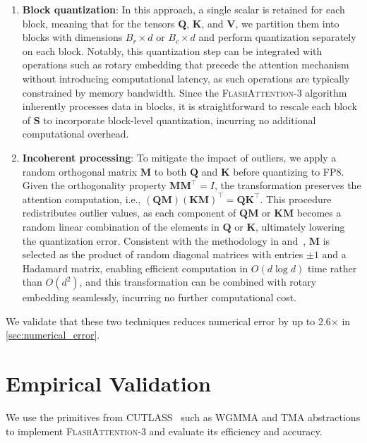 \begin{enumerate}

\item \textbf{Block quantization}: In this approach, a single scalar is retained for each block, meaning that for the tensors $\mathbf{Q}$, $\mathbf{K}$, and $\mathbf{V}$, we partition them into blocks with dimensions $B_r \times d$ or $B_c \times d$ and perform quantization separately on each block. Notably, this quantization step can be integrated with operations such as rotary embedding that precede the attention mechanism without introducing computational latency, as such operations are typically constrained by memory bandwidth. Since the \textsc{FlashAttention-3} algorithm inherently processes data in blocks, it is straightforward to rescale each block of $\mathbf{S}$ to incorporate block-level quantization, incurring no additional computational overhead.

\item \textbf{Incoherent processing}: To mitigate the impact of outliers, we apply a random orthogonal matrix $\mathbf{M}$ to both $\mathbf{Q}$ and $\mathbf{K}$ before quantizing to FP8. Given the orthogonality property $\mathbf{M} \mathbf{M}^\top = I$, the transformation preserves the attention computation, i.e., $(\mathbf{Q} \mathbf{M})(\mathbf{K} \mathbf{M})^\top = \mathbf{Q} \mathbf{K}^\top$. This procedure redistributes outlier values, as each component of $\mathbf{Q}\mathbf{M}$ or $\mathbf{K}\mathbf{M}$ becomes a random linear combination of the elements in $\mathbf{Q}$ or $\mathbf{K}$, ultimately lowering the quantization error. Consistent with the methodology in \citet{chee2024quip} and~\citet{tseng2024quip}, $\mathbf{M}$ is selected as the product of random diagonal matrices with entries $\pm1$ and a Hadamard matrix, enabling efficient computation in $O(d \log d)$ time rather than $O(d^2)$, and this transformation can be combined with rotary embedding seamlessly, incurring no further computational cost.
\end{enumerate}

We validate that these two techniques reduces numerical error by up to 2.6$\times$ in \cref{sec:numerical_error}.

\section{Empirical Validation}
\label{sec:exp}

We use the primitives from CUTLASS~\citep{Thakkar_CUTLASS_2023} such as WGMMA and TMA abstractions to implement \textsc{FlashAttention-3} and evaluate its efficiency and accuracy.

